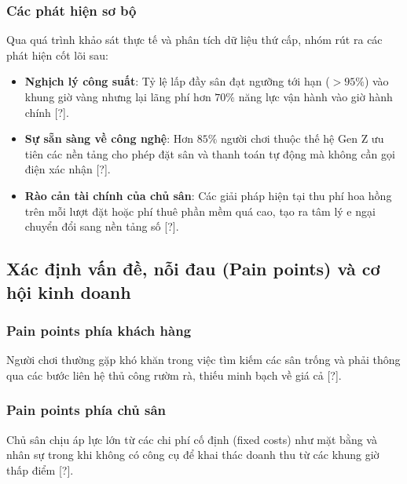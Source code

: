 \subsubsection{Các phát hiện sơ bộ}
Qua quá trình khảo sát thực tế và phân tích dữ liệu thứ cấp, nhóm rút ra các phát hiện cốt lõi sau:
\begin{itemize}
    \item \textbf{Nghịch lý công suất}: Tỷ lệ lấp đầy sân đạt ngưỡng tới hạn ($>95\%$) vào khung giờ vàng nhưng lại lãng phí hơn $70\%$ năng lực vận hành vào giờ hành chính [?].
    \item \textbf{Sự sẵn sàng về công nghệ}: Hơn $85\%$ người chơi thuộc thế hệ Gen Z ưu tiên các nền tảng cho phép đặt sân và thanh toán tự động mà không cần gọi điện xác nhận [?].
    \item \textbf{Rào cản tài chính của chủ sân}: Các giải pháp hiện tại thu phí hoa hồng trên mỗi lượt đặt hoặc phí thuê phần mềm quá cao, tạo ra tâm lý e ngại chuyển đổi sang nền tảng số [?].
\end{itemize}

\subsection{Xác định vấn đề, nỗi đau (Pain points) và cơ hội kinh doanh}
\subsubsection{Pain points phía khách hàng}
Người chơi thường gặp khó khăn trong việc tìm kiếm các sân trống và phải thông qua các bước liên hệ thủ công rườm rà, thiếu minh bạch về giá cả [?].

\subsubsection{Pain points phía chủ sân}
Chủ sân chịu áp lực lớn từ các chi phí cố định (fixed costs) như mặt bằng và nhân sự trong khi không có công cụ để khai thác doanh thu từ các khung giờ thấp điểm [?].


